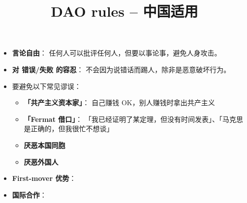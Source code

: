 \documentclass{article}
\title{DAO rules -- 中国适用}
\date{\vspace{-8ex}}
\begin{document}
\maketitle

\begin{itemize}
	\item \textbf{言论自由}： 任何人可以批评任何人，但要以事论事，避免人身攻击。
	
	\item \textbf{对 错误/失败 的容忍}： 不会因为说错话而踢人，除非是恶意破坏行为。
	
	\item 要避免以下常见谬误：

	\begin{itemize}
		\item \textbf{「共产主义资本家」}： 自己赚钱 OK，别人赚钱时拿出共产主义

		\item \textbf{「Fermat 借口」}： 「我已经证明了某定理，但没有时间发表」、「马克思是正确的，但我很忙不想谈」
		
		\item \textbf{厌恶本国同胞}
		
		\item \textbf{厌恶外国人}

	\end{itemize}

	\item \textbf{First-mover 优势}： 
	
	\item \textbf{国际合作}： 
	

\end{itemize}
\end{document}
